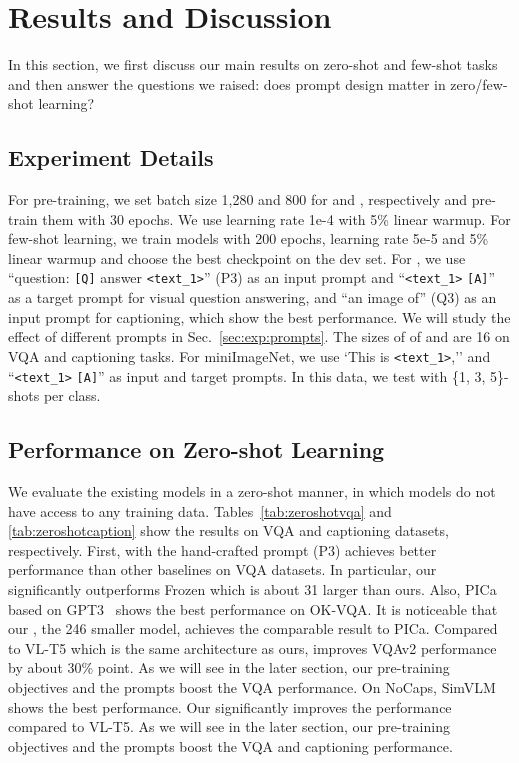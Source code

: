 
\section{Results and Discussion}
In this section, we first discuss our main results on zero-shot and few-shot tasks and then answer the questions we raised: does prompt design matter in zero/few-shot learning?



\subsection{Experiment Details} 
For pre-training, we set batch size 1,280 and 800 for \method and \method, respectively and pre-train them with 30 epochs. 
We use learning rate 1e-4 with 5\% linear warmup.
For few-shot learning, we train models with 200 epochs, learning rate 5e-5 and 5\% linear warmup and choose the best checkpoint on the dev set.
For \method, we use ``question: \texttt{[Q]} answer \texttt{<text\_1>}'' (P3) as an input prompt and ``\texttt{<text\_1>} \texttt{[A]}'' as a target prompt for visual question answering, and ``an image of'' (Q3) as an input prompt for captioning, which show the best performance. 
We will study the effect of different prompts in Sec.~\ref{sec:exp:prompts}.
The sizes of of  and  are 16 on VQA and captioning tasks.
For miniImageNet, we use `This is \texttt{<text\_1>},'' and ``\texttt{<text\_1>} \texttt{[A]}'' as input and target prompts.
In this data, we test with \{1, 3, 5\}-shots per class. 


\subsection{Performance on Zero-shot Learning}
\label{sec:zero}
We evaluate the existing models in a zero-shot manner, in which models do not have access to any training data.
Tables~\ref{tab:zeroshotvqa} and \ref{tab:zeroshotcaption} show the results on VQA and captioning datasets, respectively.
First, \method\xspace with the hand-crafted prompt (P3) achieves better performance than other baselines on VQA datasets.
In particular, our \method significantly outperforms Frozen which is about 31 larger than ours.
Also, PICa based on GPT3~\cite{brown2020language} shows the best performance on OK-VQA. 
It is noticeable that our \method, the 246 smaller model, achieves the comparable result to PICa.
Compared to VL-T5 which is the same architecture as ours, \method improves VQAv2 performance by about 30\% point. 
As we will see in the later section, our pre-training objectives and the prompts boost the VQA performance. 
On NoCaps, SimVLM shows the best performance.
Our \method significantly improves the performance compared to VL-T5.
As we will see in the later section, our pre-training objectives and the prompts boost the VQA and captioning performance. 






